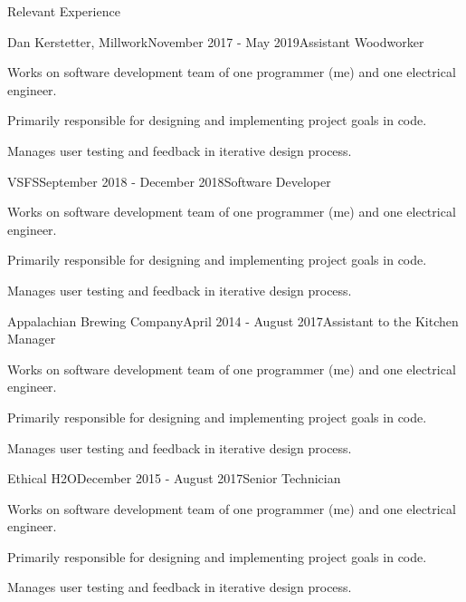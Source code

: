 \documentclass{resume} %
\begin{document}
\begin{rSection}{Relevant Experience}

\begin{rSubsection}{Dan Kerstetter, Millwork}{November 2017 - May 2019}{Assistant Woodworker}{}
\item Works on software development team of one programmer (me) and one electrical engineer.
\item Primarily responsible for designing and implementing project goals in code.
\item Manages user testing and feedback in iterative design process.
\end{rSubsection}


\begin{rSubsection}{VSFS}{September 2018 - December 2018}{Software Developer}{}
\item Works on software development team of one programmer (me) and one electrical engineer.
\item Primarily responsible for designing and implementing project goals in code.
\item Manages user testing and feedback in iterative design process.
\end{rSubsection}


\begin{rSubsection}{Appalachian Brewing Company}{April 2014 - August 2017}{Assistant to the Kitchen Manager}{}
\item Works on software development team of one programmer (me) and one electrical engineer.
\item Primarily responsible for designing and implementing project goals in code.
\item Manages user testing and feedback in iterative design process.
\end{rSubsection}


\begin{rSubsection}{Ethical H2O}{December 2015 - August 2017}{Senior Technician}{}
\item Works on software development team of one programmer (me) and one electrical engineer.
\item Primarily responsible for designing and implementing project goals in code.
\item Manages user testing and feedback in iterative design process.
\end{rSubsection}


\end{rSection}
\end{document}
